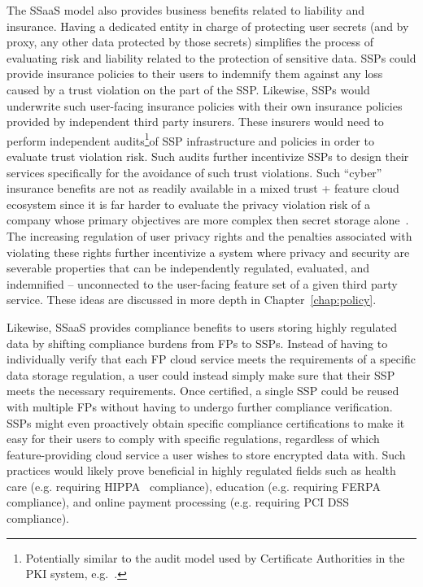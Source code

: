 The SSaaS model also provides business benefits related to liability
and insurance. Having a dedicated entity in charge of protecting user
secrets (and by proxy, any other data protected by those secrets)
simplifies the process of evaluating risk and liability related to the
protection of sensitive data. SSPs could provide insurance policies to
their users to indemnify them against any loss caused by a trust
violation on the part of the SSP. Likewise, SSPs would underwrite such
user-facing insurance policies with their own insurance policies
provided by independent third party insurers. These insurers would
need to perform independent audits\footnote{Potentially similar to the
  audit model used by Certificate Authorities in the PKI system,
  e.g.~\cite{hall-caaudit, mozilla-capolicy}.}of SSP infrastructure
and policies in order to evaluate trust violation risk. Such audits
further incentivize SSPs to design their services specifically for the
avoidance of such trust violations. Such ``cyber'' insurance benefits
are not as readily available in a mixed trust + feature cloud
ecosystem since it is far harder to evaluate the privacy violation
risk of a company whose primary objectives are more complex then
secret storage alone~\cite{ciab2015}. The increasing regulation of
user privacy rights and the penalties associated with violating these
rights further incentivize a system where privacy and security are
severable properties that can be independently regulated, evaluated,
and indemnified -- unconnected to the user-facing feature set of a
given third party service. These ideas are discussed in more depth in
Chapter~\ref{chap:policy}.

Likewise, SSaaS provides compliance benefits to users storing highly
regulated data by shifting compliance burdens from FPs to
SSPs. Instead of having to individually verify that each FP cloud
service meets the requirements of a specific data storage regulation,
a user could instead simply make sure that their SSP meets the
necessary requirements. Once certified, a single SSP could be reused
with multiple FPs without having to undergo further compliance
verification. SSPs might even proactively obtain specific compliance
certifications to make it easy for their users to comply with specific
regulations, regardless of which feature-providing cloud service a
user wishes to store encrypted data with. Such practices would likely
prove beneficial in highly regulated fields such as health care
(e.g. requiring HIPPA~\cite{hippa} compliance), education
(e.g. requiring FERPA~\cite{ferpa} compliance), and online payment
processing (e.g. requiring PCI DSS~\cite{pcidss} compliance).

